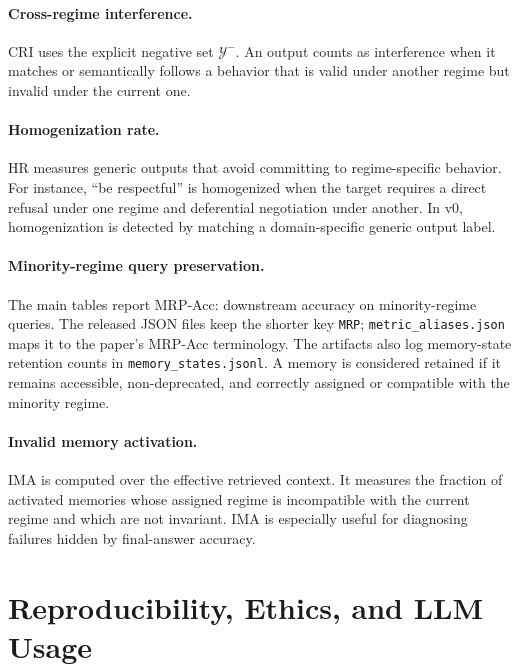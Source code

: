 \documentclass{article} %
\begin{document}
\paragraph{Cross-regime interference.}
CRI uses the explicit negative set $\mathcal{Y}^{-}$.
An output counts as interference when it matches or semantically follows a behavior that is valid under another regime but invalid under the current one.

\paragraph{Homogenization rate.}
HR measures generic outputs that avoid committing to regime-specific behavior.
For instance, ``be respectful'' is homogenized when the target requires a direct refusal under one regime and deferential negotiation under another.
In v0, homogenization is detected by matching a domain-specific generic output label.

\paragraph{Minority-regime query preservation.}
The main tables report MRP-Acc: downstream accuracy on minority-regime queries.
The released JSON files keep the shorter key \texttt{MRP}; \texttt{metric\_aliases.json} maps it to the paper's MRP-Acc terminology.
The artifacts also log memory-state retention counts in \texttt{memory\_states.jsonl}.
A memory is considered retained if it remains accessible, non-deprecated, and correctly assigned or compatible with the minority regime.

\paragraph{Invalid memory activation.}
IMA is computed over the effective retrieved context.
It measures the fraction of activated memories whose assigned regime is incompatible with the current regime and which are not invariant.
IMA is especially useful for diagnosing failures hidden by final-answer accuracy.

\section{Reproducibility, Ethics, and LLM Usage}
\label{app:reproducibility_ethics_llm}
\end{document}
